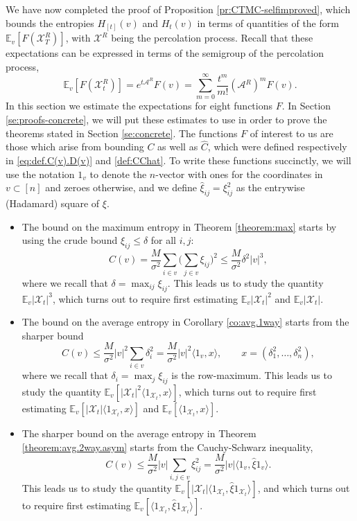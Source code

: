 \documentclass[11pt,reqno]{amsart}
\numberwithin{equation}{section}
\theoremstyle{definition}
\def\CC{{C}}
\def\A{{\mathcal A}}
\def\E{{\mathbb E}}
\def\X{{\mathcal X}}
\begin{document}
We have now completed the proof of Proposition \ref{pr:CTMC-selfimproved}, which bounds the entropies $H_{[t]}(v)$ and $H_t(v)$ in terms of quantities of the form $ \E_v[F(\X^{R}_T)]$, with $\X^{R}$ being the percolation process. Recall that these expectations can be expressed in terms of the semigroup of the percolation process,
\begin{equation}
\E_v[F(\X^{R}_t)] = e^{t\A^{R}}F(v) =  \sum_{m=0}^\infty \frac{t^m}{m!}(\A{^{R}})^m F(v). \label{eq:semigroup-series}
\end{equation}
In this section we  estimate the expectations for eight functions $F$. In Section \ref{se:proofs-concrete}, we will put these estimates to use in order to prove the theorems stated in Section \ref{se:concrete}.
The functions $F$ of interest to us are those which arise from bounding $\CC$ as well as $\widehat{\CC}$, which were defined respectively in \eqref{eq:def.C(v).D(v)} and \eqref{def:CChat}. To write these functions succinctly, we will use the notation $1_v$ to denote the $n$-vector with ones for the coordinates in $v \subset [n]$ and zeroes otherwise, and we define $\widehat{\xi}_{ij}=\xi_{ij}^2$ as the entrywise (Hadamard) square of $\xi$. 
\begin{itemize}
\item The bound on the maximum entropy in Theorem \ref{theorem:max} starts by using the crude bound $\xi_{ij}\le\delta$ for all $i,j$:
\begin{equation*}
\CC(v) = \frac{M}{\sigma^2} \sum_{i\in v}\bigg( \sum_{j \in v } \xi_{ij}\bigg)^{2} \le \frac{M}{\sigma^2} \delta^2 |v|^3,
\end{equation*}
where we recall that $\delta=\max_{ij}\xi_{ij}$.
This leads us to study the quantity $\E_v|\X_t|^3$, which turns out to require first estimating $\E_v|\X_t|^2$ and $\E_v|\X_t|$.
\item The bound on the average entropy in Corollary \ref{co:avg.1way} starts from the sharper bound
\begin{equation*}
\CC(v) \le \frac{M}{\sigma^2} |v|^2 \sum_{i\in v}\delta_i^2 = \frac{M}{\sigma^2} |v|^2 \langle 1_v,x\rangle, \qquad x=(\delta_1^2,\ldots,\delta_n^2),
\end{equation*}
where we recall that $\delta_i=\max_j\xi_{ij}$ is the row-maximum. This leads us to study the quantity $\E_v[|\X_t|^2\langle 1_{\X_t}, x\rangle]$, which turns out to require first estimating $\E_v[|\X_t| \langle 1_{\X_t}, x\rangle]$ and $\E_v[ \langle 1_{\X_t}, x\rangle]$.
\item The sharper bound on the average entropy in Theorem \ref{theorem:avg.2way.asym} starts from the Cauchy-Schwarz inequality,
\begin{equation*}
\CC(v) \le \frac{M}{\sigma^2}|v| \sum_{i,j\in v} \xi_{ij}^2 = \frac{M}{\sigma^2}|v| \langle 1_v , \widehat{\xi} 1_v \rangle .
\end{equation*}
This leads us to study the quantity $\E_v[|\X_t| \langle 1_{\X_t} , \widehat{\xi} 1_{\X_t} \rangle ]$, and which turns out to require first estimating $\E_v[ \langle 1_{\X_t} , \widehat{\xi} 1_{\X_t} \rangle ]$.
\end{itemize}
\end{document}
